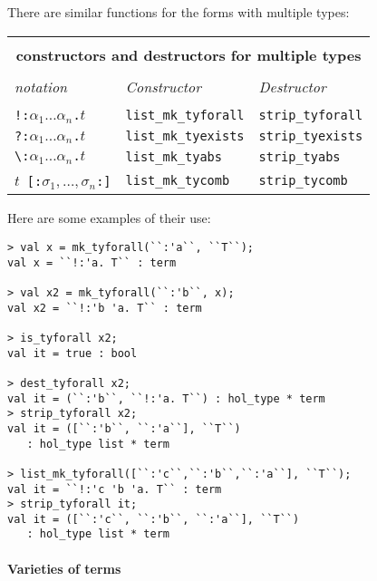 There are similar \ML{} functions for the forms with multiple types:

\begin{center}
\begin{tabular}{|l|l|l|} \hline
\multicolumn{3}{|c|}{ } \\
\multicolumn{3}{|c|}{\bf \ML{} constructors and destructors for multiple types} \\
\multicolumn{3}{|c|}{ } \\
{\it \HOL{${}_\omega$} notation} &
{\it Constructor} &
{\it Destructor} \\ \hline
 & & \\
{\small\verb|!:|}$\alpha_1\ldots\alpha_n${\small\verb|.|}$t$ &
\texttt{list\_mk\_tyforall} & \texttt{strip\_tyforall} \\ \hline
{\small\verb|?:|}$\alpha_1\ldots\alpha_n${\small\verb|.|}$t$ &
\texttt{list\_mk\_tyexists} & \texttt{strip\_tyexists} \\ \hline
{\small\verb|\:|}$\alpha_1\ldots\alpha_n${\small\verb|.|}$t$ &
\texttt{list\_mk\_tyabs} & \texttt{strip\_tyabs} \\ \hline
$t$\ {\small\verb|[:|}$\sigma_1,\ldots,\sigma_n${\small\verb|:]|} &
\texttt{list\_mk\_tycomb} & \texttt{strip\_tycomb} \\ \hline
\end{tabular}
\end{center}\label{multiple-construct-destruct-table}

Here are some examples of their use:

\begin{session}
\begin{verbatim}
> val x = mk_tyforall(``:'a``, ``T``);
val x = ``!:'a. T`` : term

> val x2 = mk_tyforall(``:'b``, x);
val x2 = ``!:'b 'a. T`` : term

> is_tyforall x2;
val it = true : bool

> dest_tyforall x2;
val it = (``:'b``, ``!:'a. T``) : hol_type * term
> strip_tyforall x2;
val it = ([``:'b``, ``:'a``], ``T``)
   : hol_type list * term

> list_mk_tyforall([``:'c``,``:'b``,``:'a``], ``T``);
val it = ``!:'c 'b 'a. T`` : term
> strip_tyforall it;
val it = ([``:'c``, ``:'b``, ``:'a``], ``T``)
   : hol_type list * term
\end{verbatim}
\end{session}

\paragraph{Varieties of terms}

